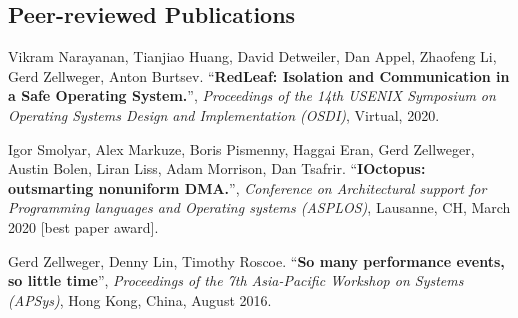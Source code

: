 \documentclass[margin,line]{cv/cv}
\begin{document}
\begin{resume}



    \pagebreak

    \section{\mysidestyle Peer-reviewed Publications}

    Vikram Narayanan, Tianjiao Huang, David Detweiler, Dan Appel, Zhaofeng Li, Gerd Zellweger, Anton Burtsev.
    ``\textbf{RedLeaf: Isolation and Communication in a Safe Operating System.}'', \textsl{Proceedings of the 14th USENIX Symposium on Operating Systems Design and Implementation (OSDI)}, Virtual, 2020.

    Igor Smolyar, Alex Markuze, Boris Pismenny, Haggai Eran, Gerd Zellweger, Austin Bolen, Liran Liss, Adam Morrison, Dan Tsafrir.
    ``\textbf{IOctopus: outsmarting nonuniform DMA.}'', \textsl{Conference on Architectural support for Programming languages and Operating systems (ASPLOS)}, Lausanne, CH, March 2020 [best paper award].

    Gerd Zellweger, Denny Lin, Timothy Roscoe.
    ``\textbf{So many performance events, so little time}'', \textsl{Proceedings of the 7th Asia-Pacific Workshop on Systems (APSys)}, Hong Kong, China, August 2016.


\end{resume}
\end{document}
